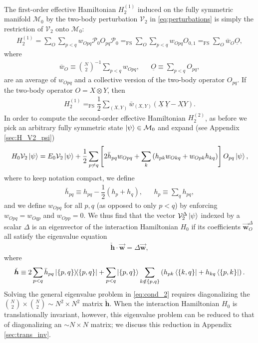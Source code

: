\documentclass[nofootinbib,notitlepage,11pt]{revtex4-2}
\newcommand{\f}[2]{\dfrac{#1}{#2}} %
\newcommand{\p}[1]{\left(#1\right)} %
\renewcommand{\sp}[1]{\left[#1\right]} %
\renewcommand{\set}[1]{\left\{#1\right\}} %
\renewcommand{\c}{\cdot} %
\newcommand{\m}{\bm} %
\renewcommand{\v}{\vec} %
\newcommand{\1}{\mathds{1}}
\newcommand{\M}{\mathcal{M}}
\renewcommand{\P}{\mathcal{P}}
\newcommand{\V}{\mathcal{V}}
\newcommand{\EQFS}{=_{\text{FS}}}
\newcommand{\col}{\underline}
\begin{document}
The first-order effective Hamiltonian $H_2^{(1)}$ induced on the fully
symmetric manifold $\M_0$ by the two-body perturbation $\V_2$ in
\eqref{eq:perturbations} is simply the restriction of $\V_2$ onto
$\M_0$:
\begin{align}
  H_2^{(1)} = \sum_O \sum_{p<q} w_{Opq} \P_0 O_{pq} \P_0
  \EQFS \sum_O \sum_{p<q} w_{Opq} O_{0,1}
  \EQFS \sum_O \bar w_O \col{O},
\end{align}
where
\begin{align}
  \bar w_O \equiv {N \choose 2}^{-1} \sum_{p<q} w_{Opq},
  &&
  \col{O} \equiv \sum_{p<q} O_{pq},
\end{align}
are an average of $w_{Opq}$ and a collective version of the two-body
operator $O_{pq}$.  If the two-body operator $O=X\otimes Y$, then
\begin{align}
  H_2^{(1)} \EQFS \f12 \sum_{\p{X,Y}} \bar w_{\p{X,Y}}
  \p{\col{X}\,\col{Y} - \col{XY}}.
\end{align}
In order to compute the second-order effective Hamiltonian
$H_2^{(2)}$, as before we pick an arbitrary fully symmetric state
$\ket\psi\in\M_0$ and expand (see Appendix \ref{sec:H_V2_psi})
\begin{align}
  H_0 \V_2 \ket\psi
  = E_0 \V_2 \ket\psi
  + \f12 \sum_{p\ne q} \sp{2\bar h_{pq} w_{Opq}
    + \sum_k \p{h_{pk} w_{Okq} + w_{Opk} h_{kq}}}
  O_{pq} \ket\psi,
  \label{eq:H_V2_psi}
\end{align}
where to keep notation compact, we define
\begin{align}
  \bar h_{pq} \equiv h_{pq} - \f12\p{h_p + h_q},
  &&
  h_p \equiv \sum_q h_{pq},
\end{align}
and we define $w_{Opq}$ for all $p,q$ (as opposed to only $p<q$) by
enforcing $w_{Opq}=w_{Oqp}$ and $w_{Opp}=0$.  We thus find that the
vector $\V_2^\Delta\ket\psi$ indexed by a scalar $\Delta$ is an
eigenvector of the interaction Hamiltonian $H_0$ if its coefficients
$\v{\m w}_O^\Delta$ all satisfy the eigenvalue equation
\begin{align}
  \check{\m h} \c \v{\m w} = \Delta \v{\m w},
  \label{eq:cond_2}
\end{align}
where
\begin{align}
  \check{\m h} \equiv 2\sum_{p<q} \bar h_{pq} \op{\set{p,q}}
  + \sum_{p<q} \ket{\set{p,q}} \sum_{k\notin\set{p,q}}
  \p{h_{pk} \bra{\set{k,q}} + h_{kq} \bra{\set{p,k}}}.
  \label{eq:h_super_mat}
\end{align}
Solving the general eigenvalue problem in \eqref{eq:cond_2} requires
diagonalizing the ${N \choose 2}\times{N \choose 2}\sim N^2\times N^2$
matrix $\check{\m h}$.  When the interaction Hamiltonian $H_0$ is
translationally invariant, however, this eigenvalue problem can be
reduced to that of diagonalizing an $\sim N\times N$ matrix; we
discuss this reduction in Appendix \ref{sec:trans_inv}.
\end{document}
